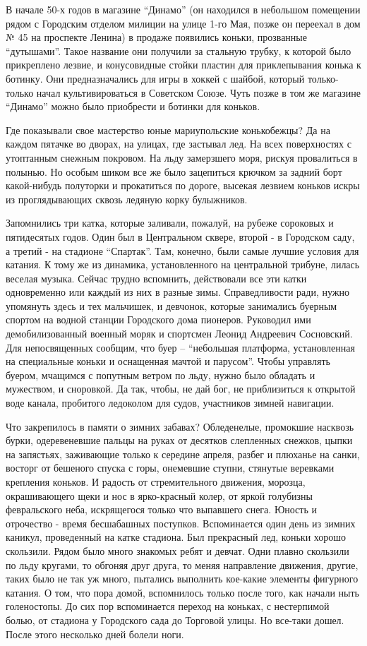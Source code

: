 В начале 50-х годов в магазине \enquote{Динамо} (он находился в небольшом помещении
рядом с Городским отделом милиции на улице 1-го Мая, позже он переехал в дом №
45 на проспекте Ленина) в продаже появились коньки, прозванные \enquote{дутышами}.
Такое название они получили за стальную трубку, к которой было прикреплено
лезвие, и конусовидные стойки пластин для приклепывания конька к ботинку. Они
предназначались для игры в хоккей с шайбой, который только-только начал
культивироваться в Советском Союзе. Чуть позже в том же магазине \enquote{Динамо} можно
было приобрести и ботинки для коньков.

Где показывали свое мастерство юные мариупольские конькобежцы? Да на каждом
пятачке во дворах, на улицах, где застывал лед. На всех поверхностях с
утоптанным снежным покровом. На льду замерзшего моря, рискуя провалиться в
полынью. Но особым шиком все же было зацепиться крючком за задний борт
какой-нибудь полуторки и прокатиться по дороге, высекая лезвием коньков искры
из проглядывающих сквозь ледяную корку булыжников. 

Запомнились три катка, которые заливали, пожалуй, на рубеже сороковых и
пятидесятых годов. Один был в Центральном сквере, второй - в Городском саду, а
третий - на стадионе \enquote{Спартак}. Там, конечно, были самые лучшие условия
для катания. К тому же из динамика, установленного на центральной трибуне,
лилась веселая музыка. Сейчас трудно вспомнить, действовали все эти катки
одновременно или каждый из них в разные зимы. Справедливости ради, нужно
упомянуть здесь и тех мальчишек, и девчонок, которые занимались буерным спортом
на водной станции Городского дома пионеров. Руководил ими демобилизованный
военный  моряк и спортсмен Леонид Андреевич Сосновский. Для непосвященных
сообщим, что буер – \enquote{небольшая платформа, установленная на специальные коньки и
оснащенная мачтой и парусом}. Чтобы управлять буером, мчащимся с попутным
ветром по льду, нужно было обладать и мужеством, и сноровкой. Да так, чтобы, не
дай бог, не приблизиться к открытой воде канала, пробитого ледоколом для судов,
участников зимней навигации.

Что закрепилось в памяти о зимних забавах? Обледенелые, промокшие насквозь
бурки, одеревеневшие пальцы на руках от десятков слепленных снежков, цыпки на
запястьях, заживающие только к середине апреля, разбег и плюханье на санки,
восторг от бешеного спуска с горы, онемевшие ступни, стянутые веревками
крепления коньков. И радость от стремительного движения, морозца, окрашивающего
щеки и нос в ярко-красный колер, от яркой голубизны февральского неба,
искрящегося только что выпавшего снега. Юность и отрочество - время бесшабашных
поступков. Вспоминается один день из зимних каникул, проведенный на катке
стадиона. Был прекрасный лед, коньки хорошо скользили. Рядом было много
знакомых ребят и девчат. Одни плавно скользили по льду кругами, то обгоняя друг
друга, то меняя направление движения, другие, таких было не так уж много,
пытались выполнить кое-какие элементы фигурного катания. О том, что пора домой,
вспомнилось только после того, как начали ныть голеностопы. До сих пор
вспоминается переход на коньках, с нестерпимой болью, от стадиона у Городского
сада до Торговой улицы. Но все-таки дошел. После этого несколько дней болели
ноги.
